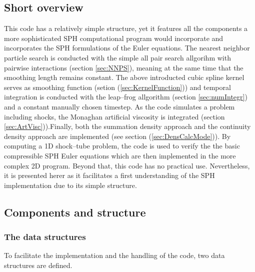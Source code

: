 \documentclass[11pt,a4paper,twoside]{report}
\begin{document}
\subsection{Short overview}

This code has a relatively simple structure, yet it features all the components
a more sophisticated SPH computational program would incorporate and incorporates the SPH formulations of the Euler equations. The nearest neighbor particle search is conducted with the simple all pair search allgorihm with pairwise interactions (section \ref{sec:NNPS}), meaning at the same time that the smoothing length remains constant. The above introducted cubic spline kernel serves as smoothing function (setion (\ref{sec:KernelFunction})) and temporal integration is conducted with the leap--frog allgorithm (section \ref{sec:numIntegr}) and a constant manually chosen timestep. As the code simulates a problem including shocks, the Monaghan artificial viscosity is integrated (section \ref{sec:ArtVisc})).Finally, both the summation density approach and the continuity density approach are implemented (see section (\ref{sec:DensCalcMode})). 
By computing a 1D shock--tube problem, the code is used to verify the the basic compressible SPH Euler equations which are then implemented in the more complex 2D program. Beyond that, this code has no practical use. Nevertheless, it is presented herer as it facilitates a first understanding of the SPH implementation due to its simple structure.
  

\subsection{Components and structure}
\label{sec:CompAndStruc1DCode}

\subsubsection{The data structures}

To facilitate the implementation and the handling of the code, two data structures are defined. 
\end{document}
